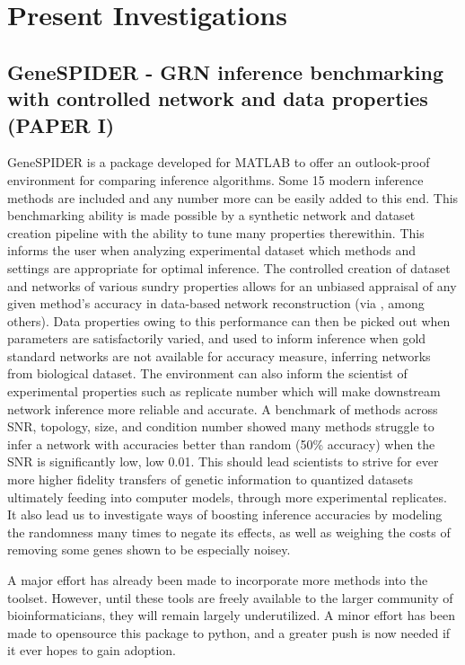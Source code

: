% 
\chapter{Present Investigations}

\section{GeneSPIDER - GRN inference benchmarking with controlled network and data properties (PAPER I)}
GeneSPIDER is a package developed for MATLAB to offer an outlook-proof environment for comparing inference algorithms. Some 15 modern inference methods are included and any number more can be easily added to this end. This benchmarking ability is made possible by a synthetic network and dataset creation pipeline with the ability to tune many properties therewithin. This informs the user when analyzing experimental dataset which methods and settings are appropriate for optimal inference. 
The controlled creation of dataset and networks of various sundry properties allows for an unbiased appraisal of any given method's accuracy in data-based network reconstruction (via , among others). Data properties owing to this performance can then be picked out when parameters are satisfactorily varied, and used to inform inference when gold standard networks are not available for accuracy measure, \ie inferring networks from biological dataset. The environment can also inform the scientist of experimental properties such as replicate number which will make downstream network inference more reliable and accurate.
A benchmark of methods across SNR, topology, size, and condition number showed many methods struggle to infer a network with accuracies better than random (50\% accuracy) when the SNR is significantly low, \ie low 0.01. This should lead scientists to strive for ever more higher fidelity transfers of genetic information to quantized datasets ultimately feeding into computer models, \ie through more experimental replicates. It also lead us to investigate ways of boosting inference accuracies by modeling the randomness many times to negate its effects, as well as weighing the costs of removing some genes shown to be especially noisey.


A major effort has already been made to incorporate more methods into the toolset. However, until these tools are freely available to the larger community of bioinformaticians, they will remain largely underutilized. A minor effort has been made to opensource this package to python, and a greater push is now needed if it ever hopes to gain adoption.



